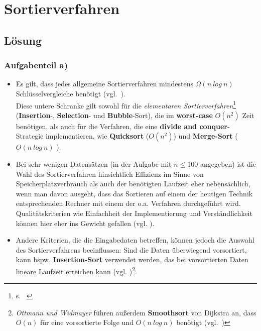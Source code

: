 \chapter{Sortierverfahren}

\section{Lösung}

\subsection{Aufgabenteil a)}

\begin{itemize}
    \item Es gilt, dass jedes allgemeine Sortierverfahren mindestens $\Omega(n\ log\ n)$ Schlüsselvergleiche benötigt (vgl.~\cite[154]{OW17b}).\\
    Diese untere Schranke gilt sowohl für die \textit{elementaren Sortierverfahren}\footnote{s. ~\cite[81]{OW17b}}  (\textbf{Insertion}-,
    \textbf{Selection}- und \textbf{Bubble}-Sort), die im \textbf{worst-case} $O(n^2)$ Zeit benötigen, als auch für die
    Verfahren, die eine \textbf{divide and conquer}-Strategie implementieren, wie \textbf{Quicksort} ($O(n^2)$)
    und \textbf{Merge-Sort} ($O(n\ log\ n)$ ).

    \item Bei sehr wenigen Datensätzen (in der Aufgabe mit $n \leq 100$ angegeben) ist die Wahl des Sortierverfahren
    hinsichtlich Effizienz im Sinne von Speicherplatzverbrauch als auch der benötigten Laufzeit eher nebensächlich, wenn man davon ausgeht,
    dass das Sortieren auf einem der heutigen Technik entsprechenden Rechner mit einem der o.a. Verfahren durchgeführt wird.\\
    Qualitätskriterien wie Einfachheit der Implementierung und Verständlichkeit können hier eher ins Gewicht gefallen (vgl. \cite[5 f.]{GD18a}).

    \item Andere Kriterien, die die Eingabedaten betreffen, können jedoch die Auswahl des Sortierverfahrens beeinflussen: Sind die Daten überwiegend
    vorsortiert, kann bspw. \textbf{Insertion-Sort} verwendet werden, das bei vorsortierten Daten lineare Laufzeit erreichen kann (vgl. \cite[188]{CL22})\footnote{
        \textit{Ottmann und Widmayer} führen außerdem \textbf{Smoothsort} von Dijkstra an, dass $O(n)$ für eine vorsortierte Folge und $O(n\ log\ n)$ benötigt (vgl.~\cite[112]{OW17b})
        }.


\end{itemize}
